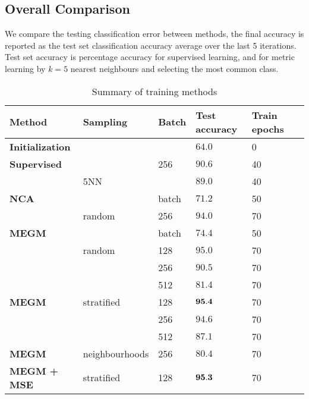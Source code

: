 \subsection{Overall Comparison}

We compare the testing classification error between methods, the final accuracy
is reported as the test set classification accuracy average over the last 5 iterations.
Test set accuracy is percentage accuracy for supervised learning, and for metric
learning by $k = 5$ nearest neighbours and selecting the most common class.




\begin{table*}[ht]

\centering
  \caption{Summary of training methods}

  \begin{tabular}{  l l  l  l l l }
  
    \toprule
    Method &  Sampling & Batch  & Test accuracy &  Train epochs \\  \hline
    \bf{Initialization} & &  &  $ 64.0  $ & 0  &  \\  
    \hline
    
    \bf{Supervised} & & 256 &  $ 90.6  $ & 40  &  \\  
     & 5NN  &  &  $ 89.0  $ & 40 &  \\  
     \hline
    
    \bf{NCA} &  & batch &  $  71.2  $ &  50  & \\
     & random & 256 & $  94.0  $ & 70 & \\
    
    \hline
    
    \bf{MEGM} &  & batch  &  $  74.4  $ &  50  & \\
     & random & 128 &  $  95.0  $ &  70  & \\     
     &  & 256 & $  90.5  $ &  70 & \\  
     &  & 512 & $  81.4  $ &  70 & \\
    
    \hline
    \bf{MEGM} & stratified & 128 & $  {\bf 95.4 }  $ & 70 & \\  
    
     &  & 256 & $  94.6  $ & 70 & \\  
     &  & 512 & $  87.1  $ & 70 & \\  

     \hline
     
    \bf{MEGM} & neighbourhoods & 256 & $  80.4  $ & 70  & \\
    
    \hline
    
    \bf{MEGM + MSE} & stratified & 128 & $  {\bf 95.3 }  $ & 70  & \\

      \bottomrule
    
    \end{tabular}
\label{fig:summary}
\end{table*}



